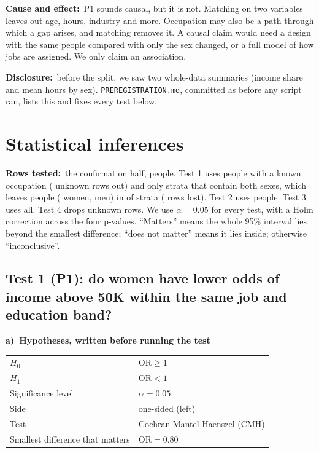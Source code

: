 \documentclass[10pt,a4paper,twocolumn]{article}
\newcommand{\field}[2]{\textbf{#1}~#2\par}
\newcommand{\tpart}[2]{\par\needspace{12\baselineskip}\smallskip\textbf{#1)~#2}\par}
\newcommand{\code}[1]{\texttt{#1}}
\begin{document}
\field{Cause and effect:}{P1 sounds causal, but it is not. Matching on two variables leaves out age, hours,
industry and more. Occupation may also be a path through which a gap arises, and matching removes it. A causal claim would need
a design with the same people compared with only the sex changed, or a full model of how jobs are assigned. We only claim an association.}

\field{Disclosure:}{before the split, we saw two whole-data summaries (income share and mean hours by sex).
\code{PREREGISTRATION.md}, committed as \PreregCommit{} before any script ran, lists this and fixes every test below.}

\section{Statistical inferences}

\field{Rows tested:}{the confirmation half, \NConfirmUsed{} people. Test 1 uses people with a known occupation
(\TOneRowsUnk{} unknown rows out) and only strata that contain both sexes, which leaves
\TOneRows{} people (\TOneNW{} women, \TOneNM{} men) in \TOneStrata{} of \TOneStrataAll{} strata (\TOneLostRows{} rows lost).
Test 2 uses \TTwoN{} people. Test 3 uses all. Test 4 drops \TFourUnk{} unknown rows.
We use $\alpha=0.05$ for every test, with a Holm correction across the four p-values.
``Matters'' means the whole 95\% interval lies beyond the smallest difference; ``does not matter'' means it lies inside; otherwise ``inconclusive''.}

\subsection*{Test 1 (P1): do women have lower odds of income above 50K within the same job and education band?}

\tpart{a}{Hypotheses, written before running the test}
{\small
\begin{tabularx}{\linewidth}{@{}K{3.4cm} Y@{}}
\toprule
$H_0$ & $\mathrm{OR}\ge1$ \\
$H_1$ & $\mathrm{OR}<1$ \\
Significance level & $\alpha=0.05$ \\
Side & one-sided (left) \\
Test & Cochran-Mantel-Haenszel (CMH) \\
Smallest difference that matters & $\mathrm{OR}=0.80$ \\
\bottomrule
\end{tabularx}}
\end{document}
